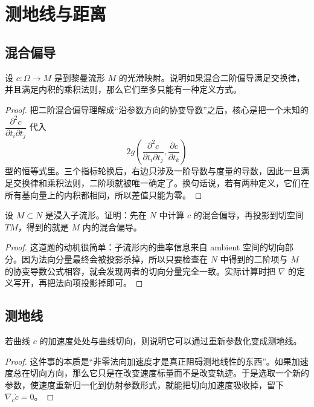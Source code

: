 \documentclass[11pt,a4paper,openany]{ctexbook}
\numberwithin{equation}{chapter}
\begin{document}
\setcounter{chapter}{4}

\chapter{测地线与距离}

\section{混合偏导}

\begin{problem}
设 \(c\colon \Omega\to M\) 是到黎曼流形 \(M\) 的光滑映射。说明如果混合二阶偏导满足交换律，并且满足内积的乘积法则，那么它们至多只能有一种定义方式。
\end{problem}
\begin{proof}
把二阶混合偏导理解成“沿参数方向的协变导数”之后，核心是把一个未知的 \(\dfrac{\partial^2 c}{\partial t_i\partial t_j}\) 代入
\[
2g\!\left(\frac{\partial^2 c}{\partial t_i\partial t_j},\frac{\partial c}{\partial t_k}\right)
\]
型的恒等式里。三个指标轮换后，右边只涉及一阶导数与度量的导数，因此一旦满足交换律和乘积法则，二阶项就被唯一确定了。换句话说，若有两种定义，它们在所有基向量上的内积都相同，所以差值只能为零。
\end{proof}

\begin{problem}
设 \(M\subset N\) 是浸入子流形。证明：先在 \(N\) 中计算 \(c\) 的混合偏导，再投影到切空间 \(T M\)，得到的就是 \(M\) 内的混合偏导。
\end{problem}
\begin{proof}
这道题的动机很简单：子流形内的曲率信息来自 ambient 空间的切向部分。因为法向分量最终会被投影杀掉，所以只要检查在 \(N\) 中得到的二阶项与 \(M\) 的协变导数公式相容，就会发现两者的切向分量完全一致。实际计算时把 \(\nabla\) 的定义写开，再把法向项投影掉即可。
\end{proof}

\section{测地线}

\begin{problem}
若曲线 \(c\) 的加速度处处与曲线切向，则说明它可以通过重新参数化变成测地线。
\end{problem}
\begin{proof}
这件事的本质是“非零法向加速度才是真正阻碍测地线性的东西”。如果加速度总在切向方向，那么它只是在改变速度标量而不是改变轨迹。于是选取一个新的参数，使速度重新归一化到仿射参数形式，就能把切向加速度吸收掉，留下 \(\nabla_{\dot c}\dot c=0\)。
\end{proof}
\end{document}
